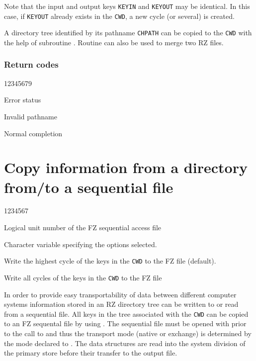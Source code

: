 Note that the input and output keys {\tt KEYIN} and {\tt KEYOUT} may be
identical. In this case, if {\tt KEYOUT} already exists in the {\tt CWD}, a new
cycle (or several) is created.

A directory tree identified by its
pathname {\tt CHPATH} can be copied
to the {\tt CWD} with the help of subroutine .
Routine  can also be used to merge two RZ files.

\subsubsection*{Return codes}
\begin{DLtt}{12345679}
\item[IQUEST(1)]Error status
\begin{DLtt}{1}
\item[1]Invalid pathname
\item[0]Normal completion
\end{DLtt}
\end{DLtt}


\section{Copy information from a directory from/to a sequential file}

\begin{DLtt}{1234567}
\item[LUNFZ]Logical unit number of the FZ sequential access file
\item[CHOPT]Character variable specifying the options selected.
\begin{DLtt}{12}
\item[' ']Write the highest cycle of the keys in the {\tt CWD}
to the FZ file (default).
\item['C']Write all cycles of the keys in the {\tt CWD} to the FZ file
\end{DLtt}
\end{DLtt}

In order to provide
easy transportability of data between different computer
systems information stored in an RZ directory tree can
be written to or read from a sequential file.
All keys in the tree associated with the {\tt CWD} can be copied
to an FZ sequental file by using .
The sequential file must be opened with  prior to
the call to  and thus the transport mode (native or exchange)
is determined by the mode declared to .
The data structures are read into the system division of the
primary store before their transfer to the output file.


